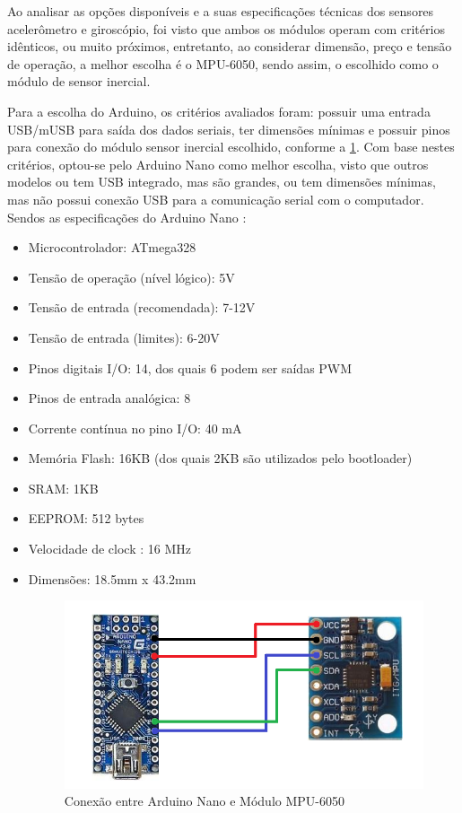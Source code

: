 Ao analisar as opções disponíveis e a suas especificações técnicas dos sensores acelerômetro e giroscópio, foi visto que ambos os módulos operam com critérios idênticos, ou muito próximos, entretanto, ao considerar dimensão, preço e tensão de operação, a melhor escolha é o MPU-6050, sendo assim, o escolhido como o módulo de sensor inercial.

Para a escolha do Arduino, os critérios avaliados foram: possuir uma entrada USB/mUSB para saída dos dados seriais, ter dimensões mínimas e possuir pinos para conexão do módulo sensor inercial escolhido, conforme a \ref{des_fig4}. Com base nestes critérios, optou-se pelo Arduino Nano como melhor escolha, visto que outros modelos ou tem USB integrado, mas são grandes, ou tem dimensões mínimas, mas não possui conexão USB para a comunicação serial com o computador. Sendos as especificações do Arduino Nano \cite{arduinonano}:

\begin{itemize}[noitemsep]
\item Microcontrolador: ATmega328
\item Tensão de operação (nível lógico): 5V
\item Tensão de entrada (recomendada): 7-12V
\item Tensão de entrada (limites): 6-20V
\item Pinos digitais I/O: 14, dos quais 6 podem ser saídas PWM
\item Pinos de entrada analógica: 8
\item Corrente contínua no pino I/O: 40 mA
\item Memória Flash: 16KB (dos quais 2KB são utilizados pelo bootloader)
\item SRAM: 1KB
\item EEPROM: 512 bytes
\item Velocidade de clock : 16 MHz
\item Dimensões:  18.5mm x 43.2mm
\begin{figure}[H]
	\centering	\includegraphics[keepaspectratio=true,scale=0.8]{figuras/conex_nano_mpu.png}
	\caption{Conexão entre Arduino Nano e Módulo MPU-6050}
	\label{des_fig4}
\end{figure}
\end{itemize}

